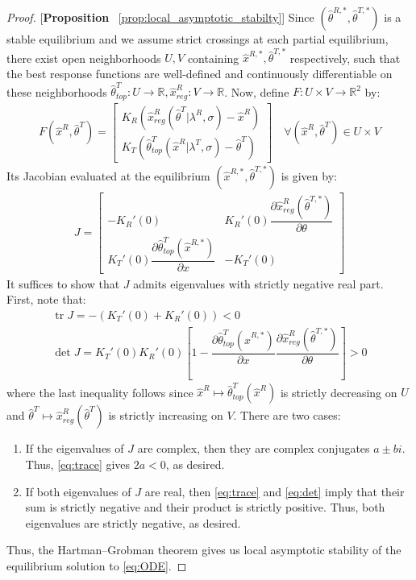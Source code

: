 \begin{proof}{[\textbf{Proposition} ~\ref{prop:local_asymptotic_stabilty}]} Since $(\hat{\theta}^{R,*},\hat{\theta}^{T,*})$ is a stable equilibrium and we assume strict crossings at each partial equilibrium, there exist open neighborhoods $U,V$ containing $\hat{x}^{R,*},\hat{\theta}^{T,*}$ respectively, such that the best response functions are well-defined and continuously differentiable on these neighborhoods $\hat{\theta}^T_{top}:U\rightarrow \mathbb{R}, \hat{x}^{R}_{reg}:V\rightarrow \mathbb{R}$. Now, define $F:U\times V\rightarrow \mathbb{R}^2$ by:
\begin{align*}
  F(\hat{x}^R,\hat{\theta}^T) = \begin{bmatrix} K_R\left(\hat{x}^R_{reg}(\hat{\theta}^T|\lambda^R,\sigma) - \hat{x}^R\right) \\ K_T\left(\hat{\theta}^T_{top}(\hat{x}^R|\lambda^T,\sigma) - \hat{\theta}^{T}\right) \end{bmatrix} \quad \forall (\hat{x}^R,\hat{\theta}^T)\in U\times V
\end{align*}
Its Jacobian evaluated at the equilibrium $(\hat{x}^{R,*},\hat{\theta}^{T,*})$ is given by:
\begin{align*}
    J = \begin{bmatrix} -K_R'(0) & K_R'(0)\dfrac{\partial \hat{x}_{reg}^R(\hat{\theta}^{T,*})}{\partial \theta} \\
    K_T'(0)\dfrac{\partial \hat{\theta}^T_{top}(\hat{x}^{R,*})}{\partial x} & -K_T'(0)  \end{bmatrix}
\end{align*}
It suffices to show that $J$ admits eigenvalues with strictly negative real part. First, note that:
\begin{gather}
  \operatorname{tr} J = -\left(K_T'(0) + K_R'(0) \right) < 0 \label{eq:trace}\\
  \operatorname{det} J = K_T'(0) K_R'(0) \left[1 - \dfrac{\partial \hat{\theta}^T_{top}(\hat{x}^{R,*})}{\partial x}\dfrac{\partial \hat{x}_{reg}^R(\hat{\theta}^{T,*})}{\partial \theta} \right] > 0 \label{eq:det}
\end{gather}
where the last inequality follows since $\hat{x}^R\mapsto \hat{\theta}^T_{top}(\hat{x}^{R})$ is strictly decreasing on $U$ and $\hat{\theta}^T\mapsto \hat{x}^R_{reg}(\hat{\theta}^T)$ is strictly increasing on $V$. There are two cases:
\begin{enumerate}[label=(\arabic*),ref=\thelemma(\arabic*)]
  \item If the eigenvalues of $J$ are complex, then they are complex conjugates $a\pm bi$. Thus, \eqref{eq:trace} gives $2a<0$, as desired. 
  \item If both eigenvalues of $J$ are real, then \eqref{eq:trace} and \eqref{eq:det} imply that their sum is strictly negative and their product is strictly positive. Thus, both eigenvalues are strictly negative, as desired. 
\end{enumerate}
Thus, the Hartman--Grobman theorem gives us local asymptotic stability of the equilibrium solution to \eqref{eq:ODE}. 
\end{proof}

